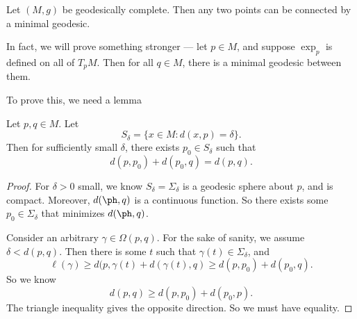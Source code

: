\documentclass[a4paper]{article}
\begin{document}
\begin{thm}
  Let $(M, g)$ be geodesically complete. Then any two points can be connected by a minimal geodesic.
\end{thm}
In fact, we will prove something stronger --- let $p \in M$, and suppose $\exp_p$ is defined on all of $T_p M$. Then for all $q \in M$, there is a minimal geodesic between them.

To prove this, we need a lemma
\begin{lemma}
  Let $p, q \in M$. Let
  \[
    S_\delta = \{x \in M: d(x, p) = \delta\}.
  \]
  Then for sufficiently small $\delta$, there exists $p_0 \in S_\delta$ such that
  \[
    d(p, p_0) + d(p_0, q) = d(p, q).
  \]
\end{lemma}

\begin{proof}
  For $\delta > 0$ small, we know $S_\delta = \Sigma_\delta$ is a geodesic sphere about $p$, and is compact. Moreover, $d(\ph, q)$ is a continuous function. So there exists some $p_0 \in \Sigma_\delta$ that minimizes $d(\ph, q)$.

  Consider an arbitrary $\gamma \in \Omega(p, q)$. For the sake of sanity, we assume $\delta < d(p, q)$. Then there is some $t$ such that $\gamma(t) \in \Sigma_\delta$, and
  \[
    \ell(\gamma) \geq d(p, \gamma(t) + d(\gamma(t), q) \geq d(p, p_0) + d(p_0, q).
  \]
  So we know
  \[
    d(p, q) \geq d(p, p_0) + d(p_0, p).
  \]
  The triangle inequality gives the opposite direction. So we must have equality.
\end{proof}
\end{document}
